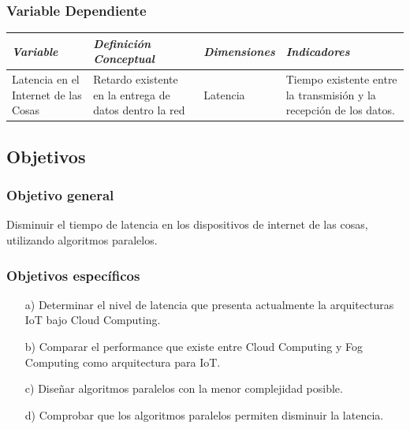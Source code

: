         \subsubsection{Variable Dependiente}
            \begin{table}[h!]
                \centering
                \begin{tabular}{|p{3cm}|p{3cm}|p{3cm}|p{3cm}|} \hline
                    
                
                \textit{{\bf{Variable}}} &
                \textit{{\bf{Definición Conceptual}}} &
                \textit{{\bf{Dimensiones}}} &
                \textit{{\bf{Indicadores}}}
                \\ \hline

                Latencia en el Internet de las Cosas &
                Retardo existente en la entrega de datos dentro la red &
                Latencia &
                Tiempo existente entre la transmisión y la recepción de los datos. 
                \\ \hline

                \end{tabular}
            \end{table}
    \subsection{Objetivos}
        \subsubsection{Objetivo general}
            Disminuir el tiempo de latencia en los dispositivos de internet de las cosas, utilizando algoritmos paralelos.
        \subsubsection{Objetivos específicos}
            \begin{enumerate}
                \item[a)] Determinar el nivel de latencia que presenta actualmente la arquitecturas IoT bajo Cloud Computing.
                \item[b)] Comparar el performance que existe entre Cloud Computing y Fog Computing como arquitectura para IoT. 
                \item[c)] Diseñar algoritmos  paralelos con la menor complejidad posible.
                \item[d)] Comprobar que los algoritmos paralelos permiten disminuir la latencia.
            \end{enumerate}
